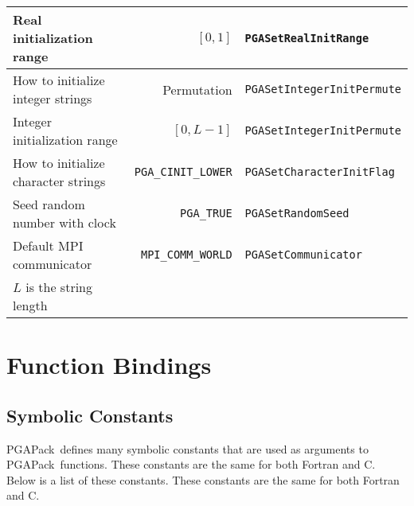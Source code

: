 \documentclass{report}
\newcommand{\pga}{PGAPack}
\begin{document}
\begin{table}
\begin{tabular}{|l|r|l|}
Real initialization range & $[0,1]$ & {\tt PGASetRealInitRange} \\ \hline
How to initialize integer strings & Permutation  & {\tt PGASetIntegerInitPermute} \\ \hline
Integer initialization range & $[0,L-1]$ & {\tt PGASetIntegerInitPermute} \\ \hline
How to initialize character strings & {\tt PGA\_CINIT\_LOWER}  & {\tt PGASetCharacterInitFlag} \\ \hline
Seed random number with clock & {\tt PGA\_TRUE}  & {\tt PGASetRandomSeed} \\ \hline
Default MPI communicator & {\tt MPI\_COMM\_WORLD} & {\tt PGASetCommunicator} \\ \hline
\multicolumn{1}{l}{$L$ is the string length} & & 
\end{tabular}
\end{table}

\chapter{Function Bindings}\label{chp:function-bindings}

\section*{Symbolic Constants}\label{app:symbolic-constants}

\pga\ defines many symbolic constants that are used as arguments
to \pga\ functions.  These constants are the same for both Fortran and C.
Below is a list of these constants.  These constants are the same for both
Fortran and C.
\end{document}
